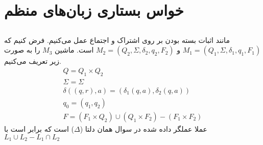 \section{خواس بستاری زبان‌های منظم}
\subsection{}
مانند اثبات بسته بودن بر روی اشتراک و اجتماع عمل می‌کنیم. فرض کنیم که
$M_1 = (Q_1, \Sigma, \delta_1, q_1, F_1)$
و
$M_2 = (Q_2, \Sigma, \delta_2, q_2, F_2)$
است. ماشین
$M_3$
را به صورت زیر تعریف می‌کنیم.
\begin{gather*}
    Q = Q_1 \times Q_2\\
    \Sigma = \Sigma\\
    \delta((q, r), a) = (\delta_1(q, a), \delta_2(q, a))\\
    q_0 = (q_1, q_2)\\
    F = (F_1 \times Q_2) \cup (Q_1 \times F_2) - (F_1 \times F_2)
\end{gather*}
عملا عملگر داده شده در سوال همان دلتا
($\Delta$)
است که برابر است با
$L_1 \cup L_2 - L_1 \cap L_2$
